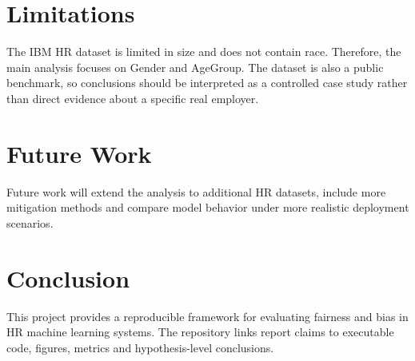 \documentclass[12pt]{article}
\begin{document}
\section{Limitations}
The IBM HR dataset is limited in size and does not contain race. Therefore, the main analysis focuses on Gender and AgeGroup. The dataset is also a public benchmark, so conclusions should be interpreted as a controlled case study rather than direct evidence about a specific real employer.

\section{Future Work}
Future work will extend the analysis to additional HR datasets, include more mitigation methods and compare model behavior under more realistic deployment scenarios.

\section{Conclusion}
This project provides a reproducible framework for evaluating fairness and bias in HR machine learning systems. The repository links report claims to executable code, figures, metrics and hypothesis-level conclusions.
\end{document}

